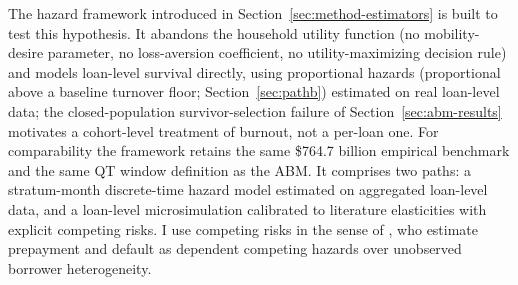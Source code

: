 \documentclass[12pt]{article}
\begin{document}
The hazard framework introduced in Section~\ref{sec:method-estimators} is built to test this hypothesis. It abandons the household utility function (no mobility-desire parameter, no loss-aversion coefficient, no utility-maximizing decision rule) and models loan-level survival directly, using proportional hazards (proportional above a baseline turnover floor; Section~\ref{sec:pathb}) estimated on real loan-level data; the closed-population survivor-selection failure of Section~\ref{sec:abm-results} motivates a cohort-level treatment of burnout, not a per-loan one. For comparability the framework retains the same \$764.7 billion empirical benchmark and the same QT window definition as the ABM. It comprises two paths: a stratum-month discrete-time hazard model estimated on aggregated loan-level data, and a loan-level microsimulation calibrated to literature elasticities with explicit competing risks. I use competing risks in the sense of \citet{deng2000}, who estimate prepayment and default as dependent competing hazards over unobserved borrower heterogeneity.
\end{document}
